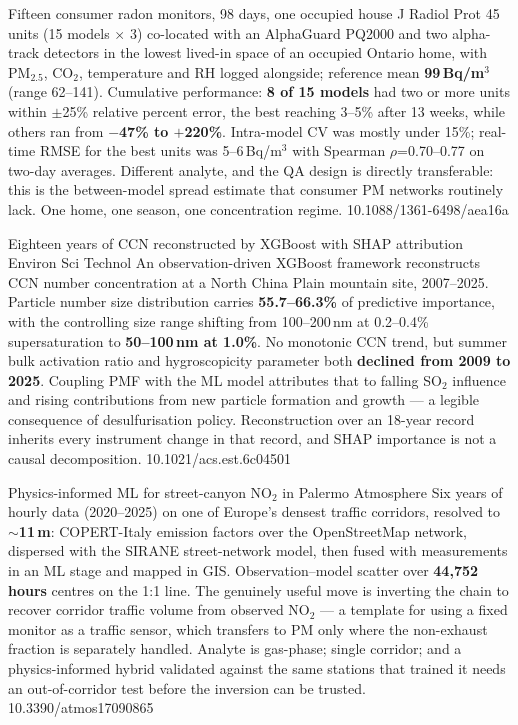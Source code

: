 \documentclass[10pt]{article}
\begin{document}
{Fifteen consumer radon monitors, 98 days, one occupied house}
{J Radiol Prot}
{45 units (15 models $\times$ 3) co-located with an AlphaGuard PQ2000 and two alpha-track
detectors in the lowest lived-in space of an occupied Ontario home, with PM$_{2.5}$,
CO$_2$, temperature and RH logged alongside; reference mean \textbf{99\,Bq/m$^3$} (range
62--141). Cumulative performance: \textbf{8 of 15 models} had two or more units within
$\pm$25\% relative percent error, the best reaching 3--5\% after 13 weeks, while others
ran from \textbf{$-$47\% to $+$220\%}. Intra-model CV was mostly under 15\%; real-time
RMSE for the best units was 5--6\,Bq/m$^3$ with Spearman $\rho$=0.70--0.77 on two-day
averages. Different analyte, and the QA design is directly transferable: this is the
between-model spread estimate that consumer PM networks routinely lack. One home, one
season, one concentration regime.}
{10.1088/1361-6498/aea16a}

{Eighteen years of CCN reconstructed by XGBoost with SHAP attribution}
{Environ Sci Technol}
{An observation-driven XGBoost framework reconstructs CCN number concentration at a North
China Plain mountain site, 2007--2025. Particle number size distribution carries
\textbf{55.7--66.3\%} of predictive importance, with the controlling size range shifting
from 100--200\,nm at 0.2--0.4\% supersaturation to \textbf{50--100\,nm at 1.0\%}. No
monotonic CCN trend, but summer bulk activation ratio and hygroscopicity parameter both
\textbf{declined from 2009 to 2025}. Coupling PMF with the ML model attributes that to
falling SO$_2$ influence and rising contributions from new particle formation and growth
--- a legible consequence of desulfurisation policy. Reconstruction over an 18-year record
inherits every instrument change in that record, and SHAP importance is not a causal
decomposition.}
{10.1021/acs.est.6c04501}

{Physics-informed ML for street-canyon NO$_2$ in Palermo}
{Atmosphere}
{Six years of hourly data (2020--2025) on one of Europe's densest traffic corridors,
resolved to \textbf{$\sim$11\,m}: COPERT-Italy emission factors over the OpenStreetMap
network, dispersed with the SIRANE street-network model, then fused with measurements in
an ML stage and mapped in GIS. Observation--model scatter over \textbf{44{,}752 hours}
centres on the 1:1 line. The genuinely useful move is inverting the chain to recover
corridor traffic volume from observed NO$_2$ --- a template for using a fixed monitor as a
traffic sensor, which transfers to PM only where the non-exhaust fraction is separately
handled. Analyte is gas-phase; single corridor; and a physics-informed hybrid validated
against the same stations that trained it needs an out-of-corridor test before the
inversion can be trusted.}
{10.3390/atmos17090865}
\end{document}
